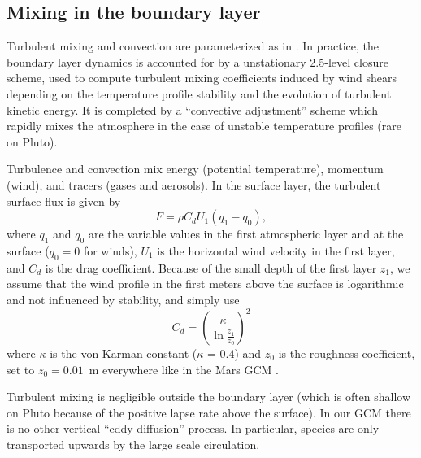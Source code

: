 \subsection{Mixing in the boundary layer}
\label{sc:subgr}
\label{sc:pbl}


Turbulent mixing and convection are parameterized
as in \cite{Forg:99}.  In practice, the boundary layer
dynamics is accounted for by a \cite{Mell:82}
unstationary 2.5-level closure scheme, used to compute turbulent mixing
coefficients induced by wind shears depending
on the temperature profile stability and the evolution of turbulent kinetic energy. 
It is completed by a ``convective adjustment'' scheme  which rapidly mixes the
atmosphere in the case of unstable temperature profiles (rare on Pluto).

Turbulence and convection mix
energy (potential temperature), momentum (wind), and tracers (gases and aerosols).
In the surface layer, the turbulent surface flux is given by
\begin{equation}
F = \rho C_d  U_1 (q_1 -q_0), 
\label{eq:sflux}
\end{equation}
where $q_1$ and $q_0$ are the variable values
in the first atmospheric layer and at the surface ($q_0=0$ for winds),
$U_1$ is the horizontal wind velocity in the first layer, and $ C_d$ is the drag
coefficient. Because of the small depth of the first layer
$z_1$, we assume that the wind profile in the first meters
above the surface is logarithmic and not influenced by stability, and simply  use
\begin{equation}
C_d = \left( \frac{\kappa}{\ln{\frac{z_1}{z_0}}} \right)^2
\end{equation}
where $\kappa$ is the von Karman
constant ($\kappa$ = $0.4$) and  $z_{0}$ is the
roughness coefficient, set to $z_{0}=0.01$~m everywhere like in the Mars GCM
\citep{Forg:99}.


Turbulent mixing is negligible outside the boundary layer (which is often shallow on Pluto because of the positive lapse
rate above the surface). In our GCM there is no other vertical ``eddy diffusion'' 
process. In particular, species are only 
transported upwards by the large scale circulation.



